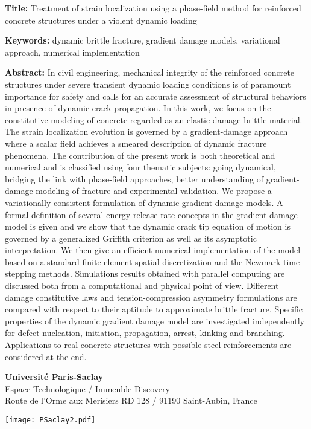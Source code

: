 \begin{flushleft}
\vspace{20pt}

\begin{mdframed}
\textbf{Title:} Treatment of strain localization using a phase-field method for reinforced concrete structures under a violent dynamic loading

\textbf{Keywords:} dynamic brittle fracture, gradient damage models, variational approach, numerical implementation

\textbf{Abstract:} In civil engineering, mechanical integrity of the reinforced concrete structures under severe transient dynamic loading conditions is of paramount importance for safety and calls for an accurate assessment of structural behaviors in presence of dynamic crack propagation. In this work, we focus on the constitutive modeling of concrete regarded as an elastic-damage brittle material. The strain localization evolution is governed by a gradient-damage approach where a scalar field achieves a smeared description of dynamic fracture phenomena. The contribution of the present work is both theoretical and numerical and is classified using four thematic subjects: going dynamical, bridging the link with phase-field approaches, better understanding of gradient-damage modeling of fracture and experimental validation. We propose a variationally consistent formulation of dynamic gradient damage models. A formal definition of several energy release rate concepts in the gradient damage model is given and we show that the dynamic crack tip equation of motion is governed by a generalized Griffith criterion as well as its asymptotic interpretation. We then give an efficient numerical implementation of the model based on a standard finite-element spatial discretization and the Newmark time-stepping methods. Simulations results obtained with parallel computing are discussed both from a computational and physical point of view. Different damage constitutive laws and tension-compression asymmetry formulations are compared with respect to their aptitude to approximate brittle fracture. Specific properties of the dynamic gradient damage model are investigated independently for defect nucleation, initiation, propagation, arrest, kinking and branching. Applications to real concrete structures with possible steel reinforcements are considered at the end.
\end{mdframed}
\end{flushleft}

\vfill

\begin{minipage}[b]{0.6\textwidth}
\small
\color{color02}
\textbf{Université Paris-Saclay} \\
Espace Technologique / Immeuble Discovery  \\
Route de l'Orme aux Merisiers RD 128 / 91190 Saint-Aubin, France
\end{minipage}
\hfill
\begin{minipage}[b]{0.35\textwidth}
\hfill
\texttt{[image: PSaclay2.pdf]}
\end{minipage}